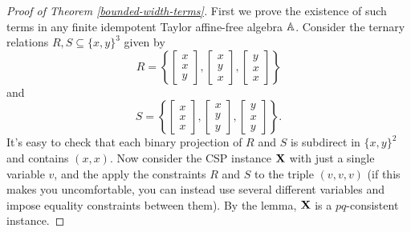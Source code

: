 \documentclass[letterpaper,11pt]{article}
\begin{document}
\begin{proof}[Proof of Theorem \ref{bounded-width-terms}] First we prove the existence of such terms in any finite idempotent Taylor affine-free algebra $\mathbb{A}$. Consider the ternary relations $R,S \subseteq \{x,y\}^3$ given by
\[
R = \left\{\begin{bmatrix} x\\ x\\ y\end{bmatrix}, \begin{bmatrix} x\\ y\\ x\end{bmatrix}, \begin{bmatrix} y\\ x\\ x\end{bmatrix}\right\}
\]
and
\[
S = \left\{\begin{bmatrix} x\\ x\\ x\end{bmatrix}, \begin{bmatrix} x\\ y\\ y\end{bmatrix}, \begin{bmatrix} y\\ x\\ y\end{bmatrix}\right\}.
\]
It's easy to check that each binary projection of $R$ and $S$ is subdirect in $\{x,y\}^2$ and contains $(x,x)$. Now consider the CSP instance $\mathbf{X}$ with just a single variable $v$, and the apply the constraints $R$ and $S$ to the triple $(v,v,v)$ (if this makes you uncomfortable, you can instead use several different variables and impose equality constraints between them). By the lemma, $\mathbf{X}$ is a $pq$-consistent instance.


\end{proof}
\end{document}
